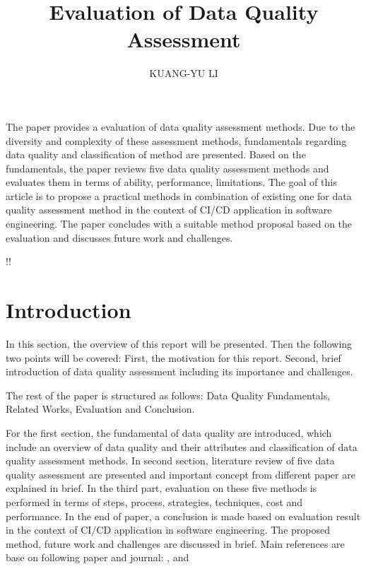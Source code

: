 \documentclass[pdftex,english,oribibl]{llncs}
\title{Evaluation of Data Quality Assessment}
\author{KUANG-YU LI}
\institute{University of Stuttgart\\Master Student in Information Technology \\70569 Stuttgart, Germany}
\makeatletter
\gdef\@keywords{}
\renewenvironment{abstract}{%
\list{}{\advance\topsep by0.35cm\relax\small%
\leftmargin=1cm%
\labelwidth=\z@%
\listparindent=\z@%
\itemindent\listparindent%
\rightmargin\leftmargin}%
\item[\hskip\labelsep\bfseries\abstractname]}{%
\if!\@keywords!\else{\item[~]\item[\hskip\labelsep\bfseries\keywordname]\@keywords}\fi%
\endlist}
\makeatother
\begin{document}
    \maketitle

    \begin{abstract}
        The paper provides a evaluation of data quality assessment methods. Due to the diversity and complexity of these assessment methods, fundamentals regarding data quality and classification of method are presented. Based on the fundamentals, the paper reviews five data quality assessment methods and evaluates them  in terms of ability, performance, limitations. The goal of this article is to propose a practical methods in combination of existing one for data quality assessment method in the context of CI/CD application in software engineering. The paper concludes with a suitable method proposal based on the evaluation and discusses future work and challenges.

    \end{abstract}
    \section{Introduction}
    In this section, the overview of this report will be presented.
    Then the following two points will be covered:
    First, the motivation for this report.
    Second, brief introduction of data quality assessment including its importance and challenges.

    The rest of the paper is structured as follows: Data Quality Fundamentals, Related Works, Evaluation and Conclusion.

    For the first section, the fundamental of data quality are introduced, which include
    an overview of data quality and their attributes and classification of data quality assessment methods.
    In second section, literature review of five data quality assessment are presented and important concept from different paper are explained in brief.
    In the third part, evaluation on these five methods is performed in terms of steps, process, strategies, techniques, cost and performance.
    In the end of paper, a conclusion is made based on evaluation result in the context of CI/CD application in software engineering.
    The proposed method, future work and challenges are discussed in brief.
    Main references are base on following paper and journal: \citet{Cai2005ChallnegesOfDataQuality}, \citet{Pipino2002DataQualityAssessment} and \citet{Batini2009MethodologiesForDataQuality} \citet{Wang1996BeyondAccuracy} \citet{Borek2011AClassficationOfDataQualityAssessmentMethods}
    \citet{Cappiello2004DataQualityAssessmentfromTheUse}
\end{document}
